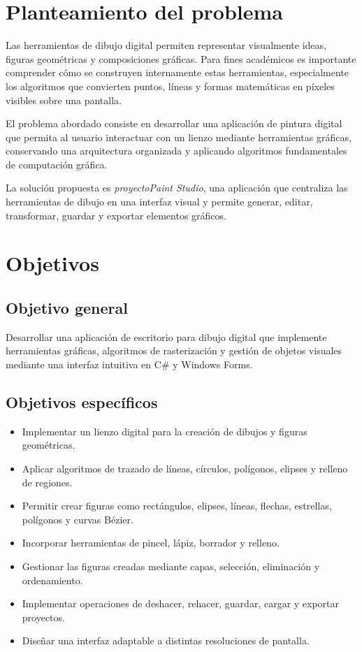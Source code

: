 \documentclass[11pt,a4paper]{report}
\begin{document}
\chapter{Planteamiento del problema}

Las herramientas de dibujo digital permiten representar visualmente ideas, figuras geométricas y composiciones gráficas. Para fines académicos es importante comprender cómo se construyen internamente estas herramientas, especialmente los algoritmos que convierten puntos, líneas y formas matemáticas en píxeles visibles sobre una pantalla.

El problema abordado consiste en desarrollar una aplicación de pintura digital que permita al usuario interactuar con un lienzo mediante herramientas gráficas, conservando una arquitectura organizada y aplicando algoritmos fundamentales de computación gráfica.

La solución propuesta es \textit{proyectoPaint Studio}, una aplicación que centraliza las herramientas de dibujo en una interfaz visual y permite generar, editar, transformar, guardar y exportar elementos gráficos.

\chapter{Objetivos}

\section{Objetivo general}

Desarrollar una aplicación de escritorio para dibujo digital que implemente herramientas gráficas, algoritmos de rasterización y gestión de objetos visuales mediante una interfaz intuitiva en C\# y Windows Forms.

\section{Objetivos específicos}

\begin{itemize}
    \item Implementar un lienzo digital para la creación de dibujos y figuras geométricas.
    \item Aplicar algoritmos de trazado de líneas, círculos, polígonos, elipses y relleno de regiones.
    \item Permitir crear figuras como rectángulos, elipses, líneas, flechas, estrellas, polígonos y curvas Bézier.
    \item Incorporar herramientas de pincel, lápiz, borrador y relleno.
    \item Gestionar las figuras creadas mediante capas, selección, eliminación y ordenamiento.
    \item Implementar operaciones de deshacer, rehacer, guardar, cargar y exportar proyectos.
    \item Diseñar una interfaz adaptable a distintas resoluciones de pantalla.
\end{itemize}
\end{document}
